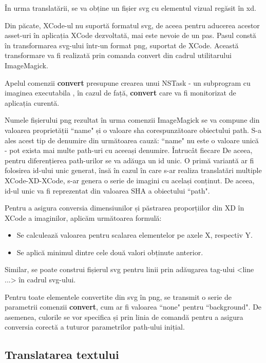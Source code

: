 În urma translatării, se va obține un fișier svg cu elementul vizual regăsit în xd. 

Din păcate, XCode-ul nu suportă formatul svg, de aceea pentru aducerea acestor asset-uri în aplicația XCode dezvoltată, mai este nevoie de un pas. Pasul constă în transformarea svg-ului într-un format png, suportat de XCode. Această transformare va fi realizată prin comanda convert din cadrul utilitarului ImageMagick. 

Apelul comenzii \textbf{convert} presupune crearea unui NSTask - un subprogram cu imaginea executabila , în cazul de față, \textbf{convert}  care va fi monitorizat de aplicația curentă. 

Numele fișierului png rezultat în urma comenzii ImageMagick se va compune din valoarea proprietății ``name" și o valoare sha corespunzătoare obiectului path. S-a ales acest tip de denumire din următoarea cauză: ``name" nu este o valoare unică - pot exista mai multe path-uri cu aceeași denumire. Întrucât fiecare De aceea, pentru diferențierea path-urilor se va adăuga un id unic. O primă variantă ar fi folosirea id-ului unic generat, însă în cazul în care s-ar realiza translatări multiple XCode-XD-XCode, s-ar genera o serie de imagini cu același conținut. De aceea, id-ul unic va fi reprezentat din valoarea SHA a obiectului ``path".

Pentru a asigura conversia dimensiunilor și păstrarea proporțiilor din XD în XCode a imaginilor, aplicăm următoarea formulă:

\begin{itemize}  
\item Se calculează valoarea pentru scalarea elementelor pe axele X, respectiv Y.
\item Se aplică minimul dintre cele două valori obținute anterior.
\end{itemize}

Similar, se poate construi fișierul svg pentru linii prin adăugarea tag-ului <line ...> în cadrul svg-ului.

Pentru toate elementele convertite din svg în png, se transmit o serie de parametrii comenzii \textbf{convert}, cum ar fi valoarea ``none" pentru ``background". De asemenea, culorile se vor specifica și prin linia de comandă pentru a asigura conversia corectă a tuturor parametrilor path-ului inițial.

\subsection{Translatarea textului}


